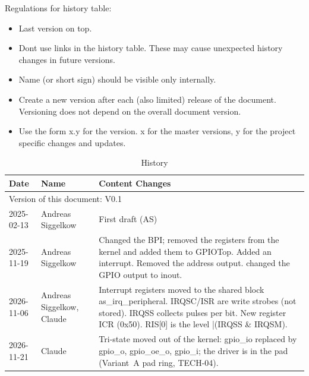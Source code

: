 Regulations for history table:
\begin{itemize}
  \item Last version on top.
  \item Dont use links in the history table. These may cause unexpected history changes in future versions.
  \item Name (or short sign) should be visible only internally.
  \item Create a new version after each (also limited) release of the document. Versioning does not depend on the overall document version.
  \item Use the form x.y for the version. x for the master versions, y for the project specific changes and updates.
\end{itemize}

\begin{table}[H]
\caption{History}
\label{tab:gpiohistory01a}
\centering
\begin{tabularx}{\textwidth}{|X |X |X |}
  \hline
  Date & Name & Content Changes \\
  \hline
  \multicolumn{3}{|l|}{Version of this document: V0.1} \\
  \hline
  2025-02-13 & Andreas Siggelkow & First draft (AS) \\
   \hline
  2025-11-19 & Andreas Siggelkow & Changed the BPI; removed the registers from the kernel and added them to GPIOTop. Added an interrupt. Removed the address output. changed the GPIO output to inout. \\
  \hline
  2026-11-06 & Andreas Siggelkow, Claude & Interrupt registers moved to the shared block as\_irq\_peripheral. IRQSC/ISR are write strobes (not stored). IRQSS collects pulses per bit. New register ICR (0x50). RIS[0] is the level |(IRQSS \& IRQSM). \\
  \hline
  2026-11-21 & Claude & Tri-state moved out of the kernel: gpio\_io replaced by gpio\_o, gpio\_oe\_o, gpio\_i; the driver is in the pad (Variant~A pad ring, TECH-04). \\
  \hline
\end{tabularx}
\end{table}
